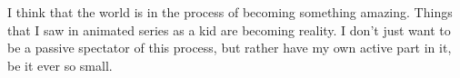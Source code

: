 I think that the world is in the process of becoming something amazing. Things that I saw in animated series as a kid are becoming reality. I don't just want to be a passive spectator of this process, but rather have my own active part in it, be it ever so small. 
